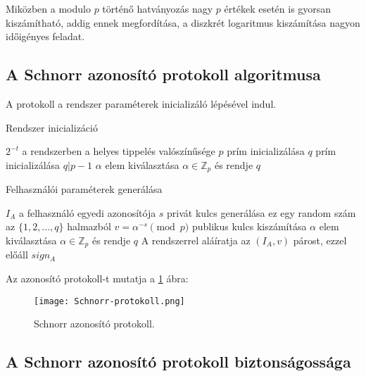 Miközben a modulo $p$ történő hatványozás nagy $p$ értékek esetén is gyorsan kiszámítható, addig ennek megfordítása, a diszkrét logaritmus kiszámítása nagyon időigényes feladat.

\subsection{A Schnorr azonosító protokoll algoritmusa}

A protokoll a rendszer paraméterek inicializáló lépésével indul.

\begin{algorithm}[H]
    \caption{Rendszer inicializáció}
    \label{algorithm:systemInit}
    \begin{algorithmic}
         \Comment $2^{-t}$ a rendszerben a helyes tippelés valószínűsége
        \State $p$ prím inicializálása
        \State $q$ prím inicializálása \Comment $q | p-1$
        \State $\alpha$ elem kiválasztása \Comment $\alpha \in \mathbb{Z}_{p}$ és rendje $q$
        \EndProcedure
    \end{algorithmic}
\end{algorithm}

\begin{algorithm}[H]
    \caption{Felhasználói paraméterek generálása}
    \label{algorithm:userInit}
    \begin{algorithmic}
         \Comment $I_{A}$ a felhasználó egyedi azonosítója
        \State $s$ privát kulcs generálása \Comment ez egy random szám az $\{1,2,...,q\}$ halmazból
        \State $v = \alpha^{-s} \pmod{p}$ publikus kulcs kiszámítása
        \State $\alpha$ elem kiválasztása \Comment $\alpha \in \mathbb{Z}_{p}$ és rendje $q$
        \State A rendszerrel aláíratja az $(I_{A}, v)$ párost, ezzel előáll $sign_{A}$
        \EndProcedure
    \end{algorithmic}
\end{algorithm}

Az azonosító protokoll-t mutatja a \ref{Figure::SchnorrProt} ábra:

\begin{figure}[H]
    \centering
    \texttt{[image: Schnorr-protokoll.png]}
    \caption{Schnorr azonosító protokoll.}
    \label{Figure::SchnorrProt}
\end{figure}

\subsection{A Schnorr azonosító protokoll biztonságossága}

